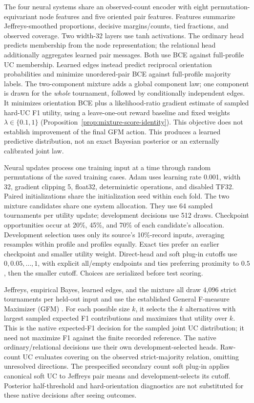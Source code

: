 The four neural systems share an observed-count encoder with eight permutation-equivariant node features and five oriented pair features. Features summarize Jeffreys-smoothed proportions, decisive margins/counts, tied fractions, and observed coverage. Two width-32 layers use tanh activations. The ordinary head predicts membership from the node representation; the relational head additionally aggregates learned pair messages. Both use BCE against full-profile UC membership. Learned edges instead predict reciprocal orientation probabilities and minimize unordered-pair BCE against full-profile majority labels. The two-component mixture adds a global component law; one component is drawn for the \emph{whole} tournament, followed by conditionally independent edges. It minimizes orientation BCE plus a likelihood-ratio gradient estimate of sampled hard-UC F1 utility, using a leave-one-out reward baseline and fixed weights $\lambda\in\{0.1,1\}$ (Proposition~\ref{prop:mixture-score-identity}). This objective does not establish improvement of the final GFM action. This produces a learned predictive distribution, not an exact Bayesian posterior or an externally calibrated joint law.

Neural updates process one training input at a time through random permutations of the saved training cases. Adam uses learning rate 0.001, width 32, gradient clipping 5, float32, deterministic operations, and disabled TF32. Paired initializations share the initialization seed within each fold. The two mixture candidates share one system allocation. They use 64 sampled tournaments per utility update; development decisions use 512 draws. Checkpoint opportunities occur at 20\%, 45\%, and 70\% of each candidate's allocation. Development selection uses only its source's 10\%-record inputs, averaging resamples within profile and profiles equally. Exact ties prefer an earlier checkpoint and smaller utility weight. Direct-head and soft plug-in cutoffs use $0,0.05,\ldots,1$, with explicit all/empty endpoints and ties preferring proximity to $0.5$, then the smaller cutoff. Choices are serialized before test scoring.

Jeffreys, empirical Bayes, learned edges, and the mixture all draw 4,096 strict tournaments per held-out input and use the established General F-measure Maximizer (GFM) \citep{waegeman2014fmeasure}. For each possible size $k$, it selects the $k$ alternatives with largest sampled expected F1 contributions and maximizes that utility over $k$. This is the native expected-F1 decision for the sampled joint UC distribution; it need not maximize F1 against the finite recorded reference. The native ordinary/relational decisions use their own development-selected heads. Raw-count UC evaluates covering on the observed strict-majority relation, omitting unresolved directions. The prespecified secondary count soft plug-in applies canonical soft UC to Jeffreys pair means and development-selects its cutoff. Posterior half-threshold and hard-orientation diagnostics are not substituted for these native decisions after seeing outcomes.

